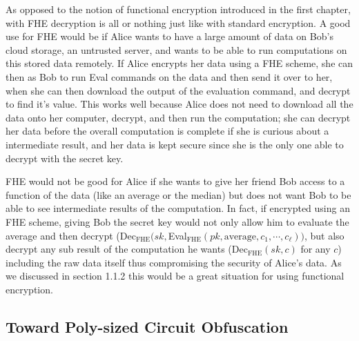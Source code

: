 \documentclass[12pt,twoside]{reedthesis}
\begin{document}
    \par As opposed to the notion of functional encryption introduced in the first chapter, with FHE decryption is all or nothing just like with standard encryption. A good use for FHE would be if Alice wants to have a large amount of data on Bob's cloud storage, an untrusted server, and wants to be able to run computations on this stored data remotely. If Alice encrypts her data using a FHE scheme, she can then as Bob to run Eval commands on the data and then send it over to her, when she can then download the output of the evaluation command, and decrypt to find it's value. This works well because Alice does not need to download all the data onto her computer, decrypt, and then run the computation; she can decrypt her data before the overall computation is complete if she is curious about a intermediate result, and her data is kept secure since she is the only one able to decrypt with the secret key.
    \par FHE would not be good for Alice if she wants to give her friend Bob access to a function of the data (like an average or the median) but does not want Bob to be able to see intermediate results of the computation. In fact, if encrypted using an FHE scheme, giving Bob the secret key would not only allow him to evaluate the average and then decrypt (Dec$_\text{FHE}(sk,$Eval$_\text{FHE}(pk,\text{average},c_1,\cdots,c_\ell))$, but also decrypt any sub result of the computation he wants (Dec$_\text{FHE}(sk,c)$ for any $c$) including the raw data itself thus compromising the security of Alice's data. As we discussed in section 1.1.2 this would be a great situation for using functional encryption.
    
    
    \subsection{Toward Poly-sized Circuit Obfuscation}
    
    \newcommand{\ionc}[0]{i\mathcal{O}_\text{NC}}
     \newcommand{\fhe}[0]{_\text{FHE}}
\end{document}
